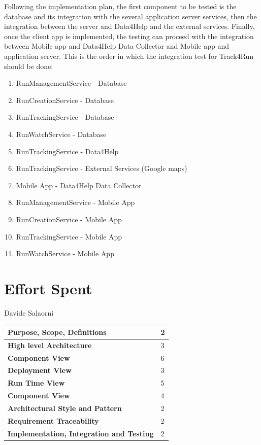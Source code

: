\documentclass[a4paper]{article}
\begin{document}
\noindent Following the implementation plan, the first component to be tested is the database and its integration with the several application server services, then the integration between the server and Data4Help and the external services.
Finally, once the client app is implemented, the testing can proceed with the integration between Mobile app and Data4Help Data Collector and Mobile app and application server.
\newline\newline This is the order in which the integration test for Track4Run should be done:

\begin{enumerate}[label*=\bf{\arabic*} . ]
    \item RunManagementService - Database
    \item RunCreationService - Database
    \item RunTrackingService - Database
    \item RunWatchService - Database
    \item RunTrackingService - Data4Help
    \item RunTrackingService - External Services (Google maps)
    \item Mobile App - Data4Help Data Collector
    \item RunManagementService - Mobile App
    \item RunCreationService - Mobile App
    \item RunTrackingService - Mobile App
    \item RunWatchService - Mobile App
\end{enumerate}

\clearpage

\section{Effort Spent}

Davide Salaorni

\begin{center}
\begin{tabular}{|l | l |}
    \hline \bf{Purpose, Scope, Definitions} & 2 \\ \hline
    \bf{High level Architecture}  & 3 \\ \hline
    \bf{Component View} & 6 \\ \hline
    \bf{Deployment View} & 3 \\ \hline
    \bf{Run Time View} & 5\\ \hline
    \bf{Component View} & 4 \\ \hline
    \bf{Architectural Style and Pattern} & 2 \\ \hline
    \bf{Requirement Traceability} & 2 \\ \hline
    \bf{Implementation, Integration and Testing} & 2 \\ \hline
\end{tabular}
\end{center}
\end{document}

